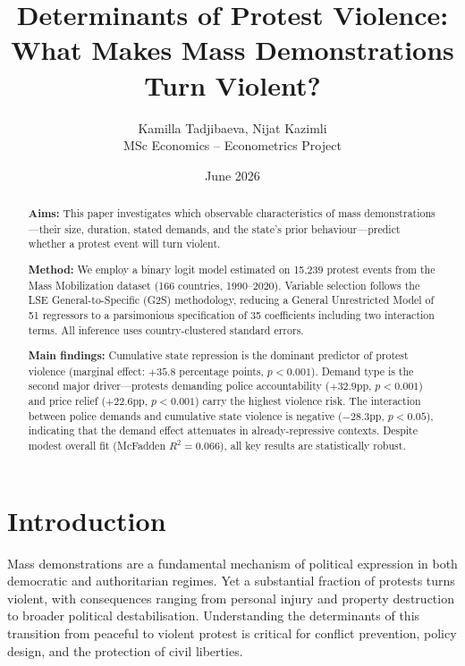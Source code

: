 \documentclass[12pt,a4paper]{article}
\title{\textbf{Determinants of Protest Violence: \\ What Makes Mass Demonstrations Turn Violent?}}
\author{Kamilla Tadjibaeva, Nijat Kazimli \\ MSc Economics -- Econometrics Project}
\date{June 2026}
\begin{document}
\maketitle

\begin{abstract}
\noindent \textbf{Aims:} This paper investigates which observable characteristics of mass demonstrations---their size, duration, stated demands, and the state's prior behaviour---predict whether a protest event will turn violent.

\noindent \textbf{Method:} We employ a binary logit model estimated on 15,239 protest events from the Mass Mobilization dataset (166 countries, 1990--2020). Variable selection follows the LSE General-to-Specific (G2S) methodology, reducing a General Unrestricted Model of 51 regressors to a parsimonious specification of 35 coefficients including two interaction terms. All inference uses country-clustered standard errors.

\noindent \textbf{Main findings:} Cumulative state repression is the dominant predictor of protest violence (marginal effect: $+35.8$ percentage points, $p < 0.001$). Demand type is the second major driver---protests demanding police accountability ($+32.9$pp, $p < 0.001$) and price relief ($+22.6$pp, $p < 0.001$) carry the highest violence risk. The interaction between police demands and cumulative state violence is negative ($-28.3$pp, $p < 0.05$), indicating that the demand effect attenuates in already-repressive contexts. Despite modest overall fit (McFadden $R^2 = 0.066$), all key results are statistically robust.
\end{abstract}

\newpage
\tableofcontents
\newpage

\section{Introduction}

Mass demonstrations are a fundamental mechanism of political expression in both democratic and authoritarian regimes. Yet a substantial fraction of protests turns violent, with consequences ranging from personal injury and property destruction to broader political destabilisation. Understanding the determinants of this transition from peaceful to violent protest is critical for conflict prevention, policy design, and the protection of civil liberties.
\end{document}
